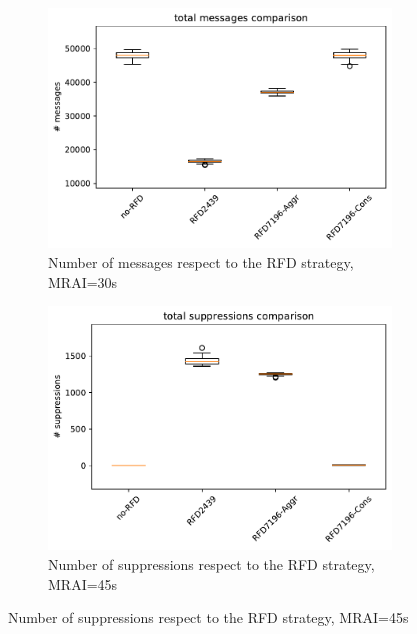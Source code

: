 \begin{figure}[H]
\begin{subfigure}[b]{0.325\textwidth}
         \label{fig:1000_RFD_MRAI30_time_mice}
     \end{subfigure}
     \hfill
     \begin{subfigure}[b]{0.325\textwidth}
         \centering
         \includegraphics[width=\textwidth]{images/RFD/miceVSelephants/MultiMRAI/45/mice/cisco_1000MRAI45_rfd_comparison_messages_boxplot.pdf}
         \caption{Number of messages respect to the RFD strategy, MRAI=30s}
         \label{fig:1000_RFD_MRAI30_messages_mice}
     \end{subfigure}
     \hfill
     \begin{subfigure}[b]{0.325\textwidth}
         \centering
         \includegraphics[width=\textwidth]{images/RFD/miceVSelephants/MultiMRAI/45/mice/cisco_1000MRAI45_rfd_comparison_suppressions_boxplot.pdf}
         \caption{Number of suppressions respect to the RFD strategy, MRAI=45s}

\end{subfigure}
\end{figure}
